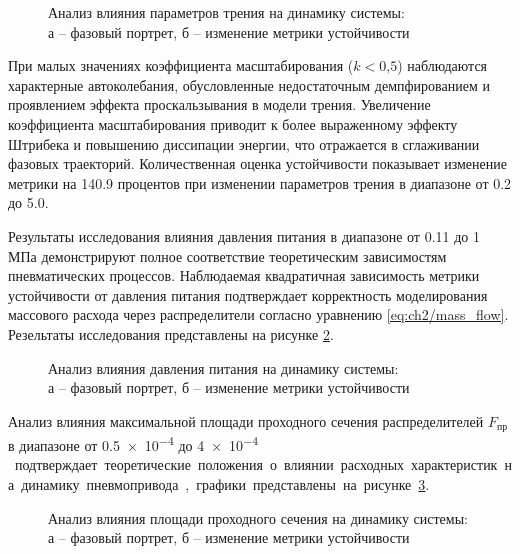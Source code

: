 \begin{figure}[ht]
    \caption{Анализ влияния параметров трения на динамику системы:\\ а -- фазовый портрет, б -- изменение метрики устойчивости}
    \label{fig:ch2/friction_analysis}
\end{figure}

При малых значениях коэффициента масштабирования ($k < \text{0,5}$) наблюдаются
характерные автоколебания, обусловленные недостаточным демпфированием и проявлением эффекта
проскальзывания в модели трения. Увеличение коэффициента масштабирования приводит к более
выраженному эффекту Штрибека и повышению диссипации энергии, что отражается в сглаживании фазовых траекторий.
Количественная оценка устойчивости показывает изменение метрики на \num{140.9} процентов при изменении
параметров трения в диапазоне от \num{0.2} до \num{5.0}.

Результаты исследования влияния давления питания в диапазоне от \num{0.11} до \num{1} МПа демонстрируют полное соответствие теоретическим
зависимостям пневматических процессов. Наблюдаемая квадратичная зависимость метрики
устойчивости от давления питания подтверждает корректность моделирования 
массового расхода через распределители согласно уравнению \ref{eq:ch2/mass_flow}. Резельтаты исследования представлены
на рисунке \ref{fig:ch2/pressure_analysis}.

\begin{figure}[ht]
    \caption{Анализ влияния давления питания на динамику системы:\\ а -- фазовый портрет, б -- изменение метрики устойчивости}
\label{fig:ch2/pressure_analysis}   
\end{figure}

Анализ влияния максимальной площади проходного сечения распределителей $F_\text{пр}$ в диапазоне от \num{0.5e-4} до \num{4e-4} \si{\metre\square}
подтверждает теоретические положения о влиянии расходных характеристик на динамику пневмопривода,
графики представлены на рисунке \ref{fig:ch2/area_analysis}.

\begin{figure}
    \caption{Анализ влияния площади проходного сечения на динамику системы:\\ а -- фазовый портрет, б -- изменение метрики устойчивости}
    \label{fig:ch2/area_analysis}
\end{figure}

